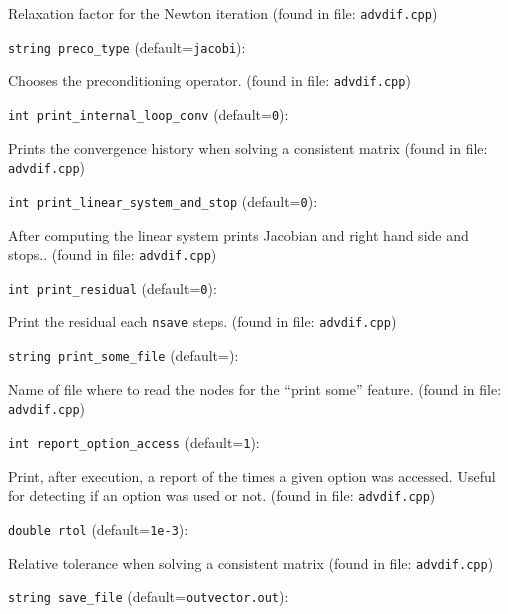 Relaxation factor for the Newton iteration
 (found in file: \verb+advdif.cpp+)
\item\verb+string preco_type+ {\rm(default=\verb|jacobi|)}:

Chooses the preconditioning operator. 
 (found in file: \verb+advdif.cpp+)
\item\verb+int print_internal_loop_conv+ {\rm(default=\verb|0|)}:

Prints the convergence history when solving a consistent matrix
 (found in file: \verb+advdif.cpp+)
\item\verb+int print_linear_system_and_stop+ {\rm(default=\verb|0|)}:

After computing the linear system prints Jacobian and
right hand side and stops.. 
 (found in file: \verb+advdif.cpp+)
\item\verb+int print_residual+ {\rm(default=\verb|0|)}:

Print the residual each \verb+nsave+ steps. 
 (found in file: \verb+advdif.cpp+)
\item\verb+string print_some_file+ {\rm(default=\verb||)}:

Name of file where to read the nodes for the ``print some'' 
feature. 
 (found in file: \verb+advdif.cpp+)
\item\verb+int report_option_access+ {\rm(default=\verb|1|)}:

Print, after execution, a report of the times a given option
was accessed. Useful for detecting if an option was used or not.
 (found in file: \verb+advdif.cpp+)
\item\verb+double rtol+ {\rm(default=\verb|1e-3|)}:

Relative tolerance when solving a consistent matrix
 (found in file: \verb+advdif.cpp+)
\item\verb+string save_file+ {\rm(default=\verb|outvector.out|)}:

